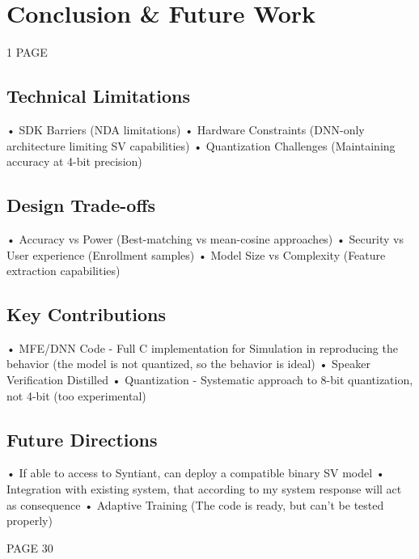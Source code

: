 \chapter{Conclusion \& Future Work}

1 PAGE\newline\newline

\label{cha:conclusion}
\section{Technical Limitations}
\label{sec:technical limits}
• SDK Barriers (NDA limitations)\newline
• Hardware Constraints (DNN-only architecture limiting SV capabilities)\newline
• Quantization Challenges (Maintaining accuracy at 4-bit precision)\newline

\section{Design Trade-offs}
\label{sec:design trade-offs}
• Accuracy vs Power (Best-matching vs mean-cosine approaches)\newline
• Security vs User experience (Enrollment samples)\newline
• Model Size vs Complexity (Feature extraction capabilities)\newline

\section{Key Contributions}
\label{sec:key contributions}
• MFE/DNN Code - Full C implementation for Simulation in reproducing the behavior (the model is not quantized, so the behavior is ideal)\newline 
• Speaker Verification Distilled\newline 
• Quantization - Systematic approach to 8-bit quantization, not 4-bit (too experimental)\newline 

\section{Future Directions}
\label{sec:future directions}
• If able to access to Syntiant, can deploy a compatible binary SV model\newline 
• Integration with existing system, that according to my system response will act as consequence\newline
• Adaptive Training (The code is ready, but can't be tested properly)\newline\newline

PAGE 30\newline

\newpage